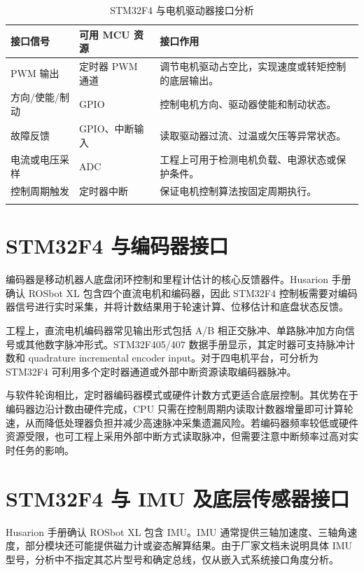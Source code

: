 \documentclass[UTF8,a4paper,12pt]{ctexrep}
\begin{document}
\begin{table}[H]
  \centering
  \caption{STM32F4 与电机驱动器接口分析}
  \label{tab:motor-driver-interface}
  \small
  \begin{tabularx}{\textwidth}{L{3.1cm}L{3.4cm}Y}
    \toprule
    \textbf{接口信号} & \textbf{可用 MCU 资源} & \textbf{接口作用} \\
    \midrule
    PWM 输出 & 定时器 PWM 通道 & 调节电机驱动占空比，实现速度或转矩控制的底层输出。 \\
    方向/使能/制动 & GPIO & 控制电机方向、驱动器使能和制动状态。 \\
    故障反馈 & GPIO、中断输入 & 读取驱动器过流、过温或欠压等异常状态。 \\
    电流或电压采样 & ADC & 工程上可用于检测电机负载、电源状态或保护条件。 \\
    控制周期触发 & 定时器中断 & 保证电机控制算法按固定周期执行。 \\
    \bottomrule
  \end{tabularx}
\end{table}

\section{STM32F4 与编码器接口}

编码器是移动机器人底盘闭环控制和里程计估计的核心反馈器件。Husarion 手册确认 ROSbot XL 包含四个直流电机和编码器，因此 STM32F4 控制板需要对编码器信号进行实时采集，并将计数结果用于轮速计算、位移估计和底盘状态反馈。

工程上，直流电机编码器常见输出形式包括 A/B 相正交脉冲、单路脉冲加方向信号或其他数字脉冲形式。STM32F405/407 数据手册显示，其定时器可支持脉冲计数和 quadrature incremental encoder input。对于四电机平台，可分析为 STM32F4 可利用多个定时器通道或外部中断资源读取编码器脉冲。

与软件轮询相比，定时器编码器模式或硬件计数方式更适合底层控制。其优势在于编码器边沿计数由硬件完成，CPU 只需在控制周期内读取计数器增量即可计算轮速，从而降低处理器负担并减少高速脉冲采集遗漏风险。若编码器频率较低或硬件资源受限，也可工程上采用外部中断方式读取脉冲，但需要注意中断频率过高对实时任务的影响。

\section{STM32F4 与 IMU 及底层传感器接口}

Husarion 手册确认 ROSbot XL 包含 IMU。IMU 通常提供三轴加速度、三轴角速度，部分模块还可能提供磁力计或姿态解算结果。由于厂家文档未说明具体 IMU 型号，分析中不指定其芯片型号和确定总线，仅从嵌入式系统接口角度分析。
\end{document}
